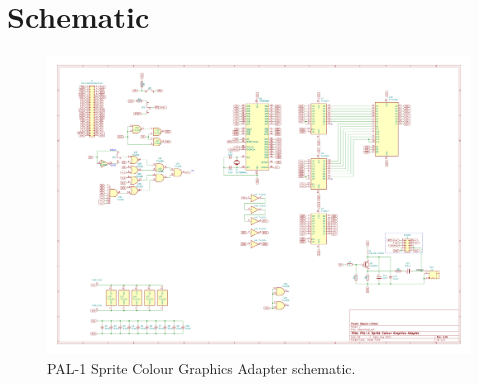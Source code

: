 \documentclass[a4paper,11pt,twoside,openright]{report}
\begin{document}
\chapter{Schematic}
\label{sec:schematic}

\begin{figure}[h!]
	\centering
	\includegraphics[scale=.24,angle=90,origin=c]{images/scga-schematic-1.0a.png}
	\caption[Sprite Colour Graphics Adapter schematic]{PAL-1 Sprite Colour Graphics Adapter schematic.}
	\label{fig:layout}
\end{figure}
\end{document}
